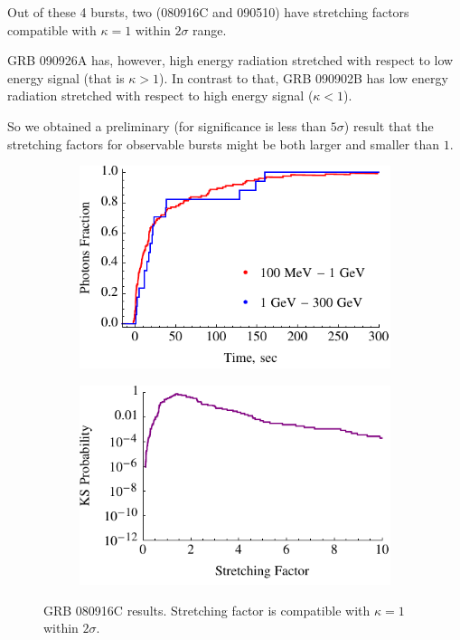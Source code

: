 \documentclass{article}
\begin{document}
Out of these 4 bursts, two (080916C and 090510) have stretching factors compatible with $\kappa = 1$ within $2\sigma$ range.

GRB 090926A has, however, high energy radiation stretched with respect to low energy signal (that is $\kappa > 1$). In contrast to that, GRB 090902B has low energy radiation stretched with respect to high energy signal ($\kappa < 1$).

So we obtained a preliminary (for significance is less than $5\sigma$) result that the stretching factors for observable bursts might be both larger and smaller than $1$.

\begin{figure}
        \centering
        \begin{subfigure}{0.49\textwidth}
                \includegraphics[width=\textwidth]{lightCurve080916C}
                \label{fig:lightCurve080916C}
        \end{subfigure}
        \begin{subfigure}{0.49\textwidth}
                \includegraphics[width=\textwidth]{probabilities080916C}
                \label{fig:probabilities080916C}
        \end{subfigure}
        \caption{GRB 080916C results. Stretching factor is compatible with $\kappa = 1$ within $2\sigma$.}
        \label{fig:grb080916C}
\end{figure}
\end{document}
